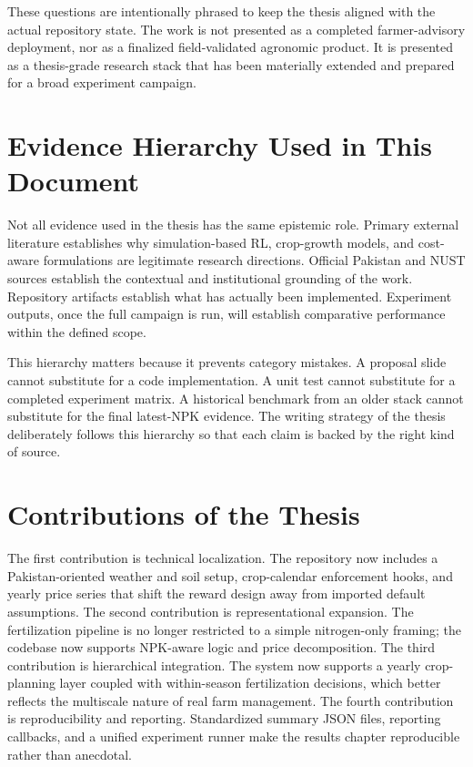 These questions are intentionally phrased to keep the thesis aligned with the actual repository state. The work is not presented as a completed farmer-advisory deployment, nor as a finalized field-validated agronomic product. It is presented as a thesis-grade research stack that has been materially extended and prepared for a broad experiment campaign.

\section{Evidence Hierarchy Used in This Document}

Not all evidence used in the thesis has the same epistemic role. Primary external literature establishes why simulation-based RL, crop-growth models, and cost-aware formulations are legitimate research directions. Official Pakistan and NUST sources establish the contextual and institutional grounding of the work. Repository artifacts establish what has actually been implemented. Experiment outputs, once the full campaign is run, will establish comparative performance within the defined scope.

This hierarchy matters because it prevents category mistakes. A proposal slide cannot substitute for a code implementation. A unit test cannot substitute for a completed experiment matrix. A historical benchmark from an older stack cannot substitute for the final latest-NPK evidence. The writing strategy of the thesis deliberately follows this hierarchy so that each claim is backed by the right kind of source.

\section{Contributions of the Thesis}

The first contribution is technical localization. The repository now includes a Pakistan-oriented weather and soil setup, crop-calendar enforcement hooks, and yearly price series that shift the reward design away from imported default assumptions. The second contribution is representational expansion. The fertilization pipeline is no longer restricted to a simple nitrogen-only framing; the codebase now supports NPK-aware logic and price decomposition. The third contribution is hierarchical integration. The system now supports a yearly crop-planning layer coupled with within-season fertilization decisions, which better reflects the multiscale nature of real farm management. The fourth contribution is reproducibility and reporting. Standardized summary JSON files, reporting callbacks, and a unified experiment runner make the results chapter reproducible rather than anecdotal.


